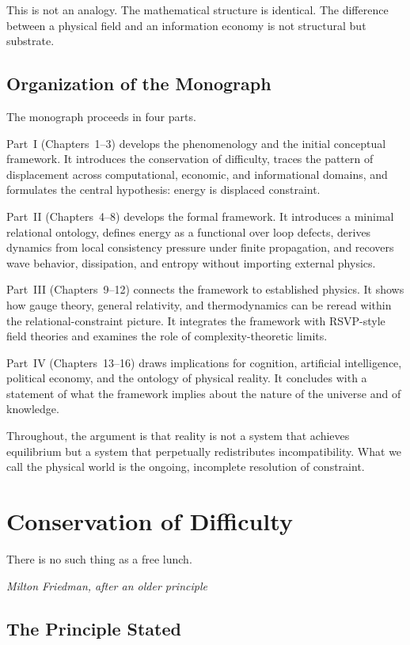 \documentclass[12pt,a4paper,openany]{book}
\theoremstyle{plain}
\theoremstyle{definition}
\theoremstyle{remark}
\begin{document}
This is not an analogy. The mathematical structure is identical. The difference between a physical field and an information economy is not structural but substrate.

\section{Organization of the Monograph}

The monograph proceeds in four parts.

Part~I (Chapters~1--3) develops the phenomenology and the initial conceptual framework. It introduces the conservation of difficulty, traces the pattern of displacement across computational, economic, and informational domains, and formulates the central hypothesis: energy is displaced constraint.

Part~II (Chapters~4--8) develops the formal framework. It introduces a minimal relational ontology, defines energy as a functional over loop defects, derives dynamics from local consistency pressure under finite propagation, and recovers wave behavior, dissipation, and entropy without importing external physics.

Part~III (Chapters~9--12) connects the framework to established physics. It shows how gauge theory, general relativity, and thermodynamics can be reread within the relational-constraint picture. It integrates the framework with RSVP-style field theories and examines the role of complexity-theoretic limits.

Part~IV (Chapters~13--16) draws implications for cognition, artificial intelligence, political economy, and the ontology of physical reality. It concludes with a statement of what the framework implies about the nature of the universe and of knowledge.

Throughout, the argument is that reality is not a system that achieves equilibrium but a system that perpetually redistributes incompatibility. What we call the physical world is the ongoing, incomplete resolution of constraint.

\chapter{Conservation of Difficulty}

\epigraph{%
  There is no such thing as a free lunch.
}{%
  \textit{Milton Friedman, after an older principle}}

\section{The Principle Stated}
\end{document}
